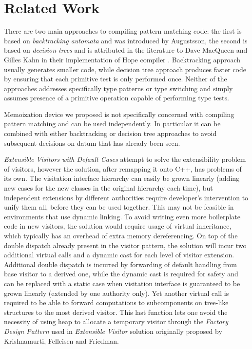 \documentclass[preprint]{sigplanconf}
\begin{document}
\section{Related Work} %
\label{sec:rw}

There are two main approaches to compiling pattern matching code: the first is 
based on \emph{backtracking automata} and was introduced by Augustsson\cite{}, 
the second is based on \emph{decision trees} and is attributed in the literature 
to Dave MacQueen and Gilles Kahn in their implementation of Hope compiler \cite{}.
Backtracking approach usually generates smaller code, while decision tree 
approach produces faster code by ensuring that each primitive test is only 
performed once. Neither of the approaches addresses specifically type patterns 
or type switching and simply assumes presence of a primitive operation capable 
of performing type tests.

Memoization device we proposed is not specifically concerned with compiling 
pattern matching and can be used independently. In particular it can be combined 
with either backtracking or decision tree approaches to avoid subsequent 
decisions on datum that has already been seen.


\emph{Extensible Visitors with Default Cases}\cite[]{Zenger:2001} attempt to solve the extensibility problem of visitors, 
however the solution, after 
remapping it onto C++, has problems of its own. The visitation interface 
hierarchy can easily be grown linearly (adding new cases for the new classes in 
the original hierarchy each time), but independent extensions by different  
authorities require developer's intervention to unify them all, before they can 
be used together. This may not be feasible in environments that use dynamic 
linking. To avoid writing even more boilerplate code in new visitors, the 
solution would require usage of virtual inheritance, which typically has 
an overhead of extra memory dereferencing. On top of the double dispatch already 
present in the visitor pattern, the solution will incur two additional virtual 
calls and a dynamic cast for each level of visitor extension. Additional double 
dispatch is incurred by forwarding of default handling from base visitor to a 
derived one, while the dynamic cast is required for safety and can be replaced 
with a static case when visitation interface is guaranteed to be grown linearly 
(extended by one authority only). Yet another virtual call is required to be 
able to forward computations to subcomponents on tree-like structures to the 
most derived visitor. This last function lets one avoid the necessity of using 
heap to allocate a temporary visitor through the \emph{Factory Design 
Pattern}\cite{DesignPatterns1993} used in \emph{Extensible Visitor} solution 
originally proposed by Krishnamurti, Felleisen and Friedman\cite{Krishnamurthi98}.
\end{document}
